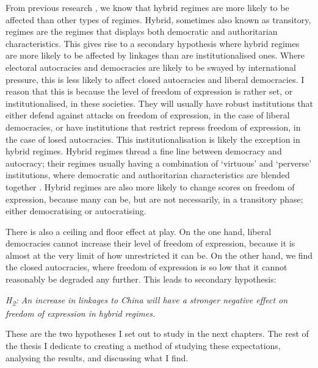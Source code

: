 From previous research \citep{toettoe_foreign_2023}, we know that hybrid regimes are more likely to be affected than other types of regimes. Hybrid, sometimes also known as transitory, regimes are the regimes that displays both democratic and authoritarian characteristics. This gives rise to a secondary hypothesis where hybrid regimes are more likely to be affected by linkages than are institutionalised ones. Where electoral autocracies and democracies are likely to be swayed by international pressure, this is less likely to affect closed autocracies and liberal democracies. I reason that this is because the level of freedom of expression is rather set, or institutionalised, in these societies. They will usually have robust institutions that either defend against attacks on freedom of expression, in the case of liberal democracies, or have institutions that restrict repress freedom of expression, in the case of losed autocracies. This institutionalisation is likely the exception in hybrid regimes. Hybrid regimes thread a fine line between democracy and autocracy; their regimes usually having a combination of `virtuous' and `perverse' institutions, where democratic and authoritarian characteristics are blended together \citep{valenzuela_democratic_1990}. Hybrid regimes are also more likely to change scores on freedom of expression, because many can be, but are not necessarily, in a transitory phase; either democratising or autocratising.

There is also a ceiling and floor effect at play. On the one hand, liberal democracies cannot increase their level of freedom of expression, because it is almost at the very limit of how unrestricted it can be. On the other hand, we find the closed autocracies, where freedom of expression is so low that it cannot reasonably be degraded any further. This leads to secondary hypothesis:
\begin{displayquote}
    \textit{H\textsubscript{2}: An increase in linkages to China will have a stronger negative effect on freedom of expression in hybrid regimes.}
\end{displayquote}

These are the two hypotheses I set out to study in the next chapters. The rest of the thesis I dedicate to creating a method of studying these expectations, analysing the results, and discussing what I find. 